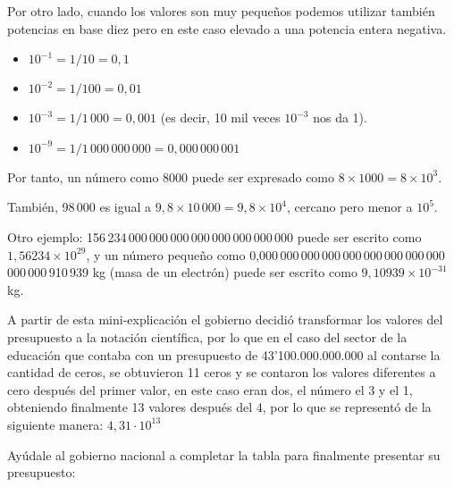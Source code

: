 \documentclass[12pt,a4paper]{article}
\begin{document}
\begin{tcolorbox}[colback=fondorosa,colframe=rojoclaro,title=\textbf{Mini Explicación: Identificando la notación científica},fonttitle=\bfseries,breakable]
Por otro lado, cuando los valores son muy pequeños podemos utilizar también potencias en base diez pero en este caso elevado a una potencia entera negativa.

\begin{itemize}
\item $10^{-1} = 1/10 = 0,1$
\item $10^{-2} = 1/100 = 0,01$
\item $10^{-3} = 1/1\,000 = 0,001$ (es decir, 10 mil veces $10^{-3}$ nos da 1).
\item $10^{-9} = 1/1\,000\,000\,000 = 0,000\,000\,001$
\end{itemize}

Por tanto, un número como 8000 puede ser expresado como $8 \times 1000 = 8 \times 10^3$.

También, 98\,000 es igual a $9,8 \times 10\,000 = 9,8 \times 10^4$, cercano pero menor a $10^5$.

Otro ejemplo: 156\,234\,000\,000\,000\,000\,000\,000\,000\,000 puede ser escrito como $1,56234 \times 10^{29}$, y un número pequeño como 0,000\,000\,000\,000\,000\,000\,000\,000\,000\,000\,000\,910\,939 kg (masa de un electrón) puede ser escrito como $9,10939 \times 10^{-31}$ kg.

\end{tcolorbox}

\vspace{0.5cm}

A partir de esta mini-explicación el gobierno decidió transformar los valores del presupuesto a la notación científica, por lo que en el caso del sector de la educación que contaba con un presupuesto de 43'100.000.000.000 al contarse la cantidad de ceros, se obtuvieron 11 ceros y se contaron los valores diferentes a cero después del primer valor, en este caso eran dos, el número el 3 y el 1, obteniendo finalmente 13 valores después del 4, por lo que se representó de la siguiente manera: $4,31 \cdot 10^{13}$

\vspace{0.5cm}

Ayúdale al gobierno nacional a completar la tabla para finalmente presentar su presupuesto:

\vspace{0.5cm}
\end{document}
